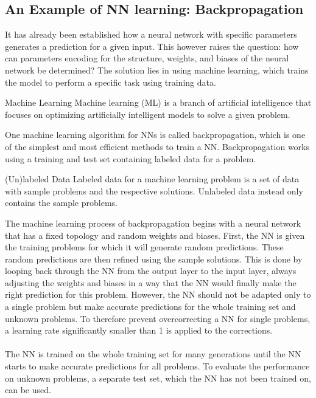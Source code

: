 \subsection{An Example of NN learning: Backpropagation}\label{subsec:an-example-of-nn-learning:-backpropagation}
It has already been established how a neural network with specific parameters generates a prediction for a given input.
This however raises the question: how can parameters encoding for the structure, weights, and biases of the neural network be determined?
The solution lies in using machine learning, which trains the model to perform a specific task using training data.
\begin{mydef}{Machine Learning}
    Machine learning (ML) is a branch of artificial intelligence that focuses on optimizing artificially intelligent models to solve a given problem.\cite{IBM_Machine_Learning}
\end{mydef}
One machine learning algorithm for NNs is called backpropagation, which is one of the simplest and most efficient methods to train a NN.\cite{Al-Masri2024}
Backpropagation works using a training and test set containing labeled data for a problem.
\begin{mydef}{(Un)labeled Data}
    Labeled data for a machine learning problem is a set of data with sample problems and the respective solutions.
    Unlabeled data instead only contains the sample problems.\cite{IBM_Data_Labeling}
\end{mydef}
The machine learning process of backpropagation begins with a neural network that has a fixed topology and random weights and biases.
First, the NN is given the training problems for which it will generate random predictions.
These random predictions are then refined using the sample solutions.
This is done by looping back through the NN from the output layer to the input layer, always adjusting the weights and biases in a way that the NN would finally make the right prediction for this problem.
However, the NN should not be adapted only to a single problem but make accurate predictions for the whole training set and unknown problems.
To therefore prevent overcorrecting a NN for single problems, a learning rate significantly smaller than 1 is applied to the corrections.
\\ \\
The NN is trained on the whole training set for many generations until the NN starts to make accurate predictions for all problems.
To evaluate the performance on unknown problems, a separate test set, which the NN has not been trained on, can be used.


